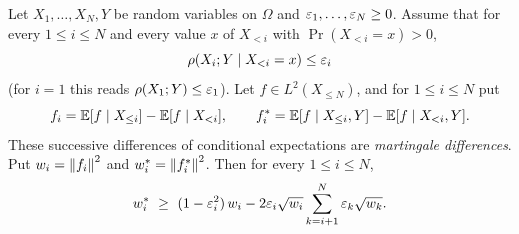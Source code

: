 \begin{lemma}\label{lem:peyre:one}
Let $X_1,\dots,X_N,Y$ be random variables on $\Omega$ and
$\varepsilon_1,\dots,\varepsilon_N\ge0$. Assume that for every $1\le i\le N$ and every
value $x$ of $X_{<i}$ with $\Pr(X_{<i}=x)>0$,
\begin{equation}\label{eq:peyre:one-hyp}
  \rho(X_i;Y\mid X_{<i}=x)\le\varepsilon_i
\end{equation}
(for $i=1$ this reads $\rho(X_1;Y)\le\varepsilon_1$). Let $f\in L^2(X_{\le N})$, and
for $1\le i\le N$ put
\[
  f_i=\mathbb E[f\mid X_{\le i}]-\mathbb E[f\mid X_{<i}],\qquad
  f_i^*=\mathbb E[f\mid X_{\le i},Y]-\mathbb E[f\mid X_{<i},Y].
\]
These successive differences of conditional expectations are
\emph{martingale differences}. Put $w_i=\left\|f_i\right\|^2$ and
$w_i^*=\left\|f_i^*\right\|^2$. Then for every $1\le i\le N$,
\begin{equation}\label{eq:peyre:one}
  w_i^*\ \ge\ (1-\eps_i^2)\,w_i-2\eps_i\sqrt{w_i}\sum_{k=i+1}^N\eps_k\sqrt{w_k}.
\end{equation}
\end{lemma}


